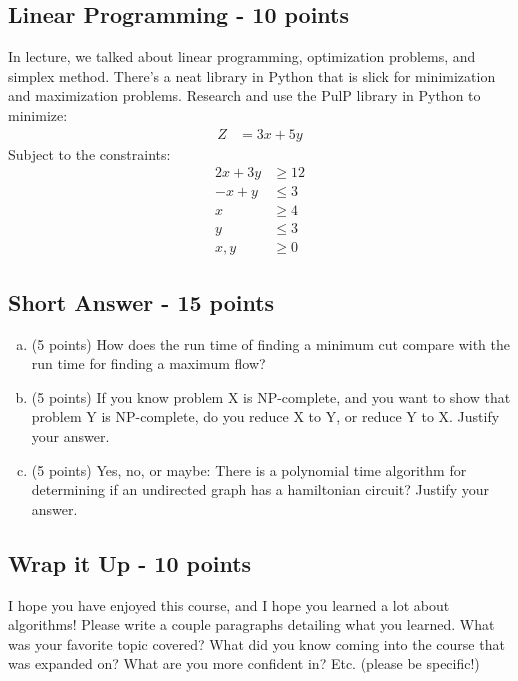 \documentclass[12pt]{amsart}
\begin{document}
\subsection{Linear Programming - 10 points} 
In lecture, we talked about linear programming, optimization problems, and simplex method. There's a neat library in Python that is slick for minimization and maximization problems. Research and use the PulP library in Python to minimize: \\
\begin{align*} 
Z &= 3x + 5y 
\end{align*}
Subject to the constraints:  
\begin{align*} 
2x + 3y &\geq 12 \\
-x + y &\leq 3 \\
x &\geq 4 \\
y &\leq 3 \\
x, y &\geq 0
\end{align*}


\subsection{Short Answer - 15 points} 
\begin{enumerate}[a.] 
\item (5 points) How does the run time of finding a minimum cut compare with the run time for finding a maximum flow? \\
\item (5 points) If you know problem X is NP-complete, and you want to show that problem Y is NP-complete, do you reduce X to Y, or reduce Y to X. Justify your answer. \\
\item (5 points) Yes, no, or maybe: There is a polynomial time algorithm for determining if an undirected graph has a hamiltonian circuit? Justify your answer. \\
\end{enumerate}

\subsection{Wrap it Up - 10 points} 
I hope you have enjoyed this course, and I hope you learned a lot about algorithms! Please write a couple paragraphs detailing what you learned. What was your favorite topic covered? What did you know coming into the course that was expanded on? What are you more confident in? Etc. (please be specific!)
\end{document}

